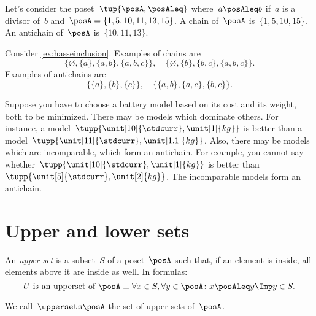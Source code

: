 \begin{example}
  Let's consider the poset~$\tup{\posA,\posAleq}$ where~$a\posAleq b$ if~$a$ is a divisor of~$b$ and~$\posA=\{1,5,10,11,13,15\}$. A chain of~$\posA$ is~$\{1,5,10,15\}$. An antichain of~$\posA$ is~$\{10,11,13\}$.
\end{example}

\begin{example}
  Consider \cref{ex:hasseinclusion}. Examples of chains are
  \begin{equation}
    \{\varnothing,\{a\},\{a,b\},\{a,b,c\}\}, \quad  \{\varnothing,\{b\},\{b,c\},\{a,b,c\}\}.
  \end{equation}
  Examples of antichains are
  \begin{equation}
    \{\{a\},\{b\},\{c\}\}, \quad \{ \{a,b\},\{a,c\}, \{b,c\}\}.
  \end{equation}
\end{example}

\begin{example}
  \label{ex:battery}
  Suppose you have to choose a battery model based on its cost and its weight, both to be minimized.
  There may be models which dominate others.
  For instance, a model~$\tupp{\unit[10]{\stdcurr},\unit[1]{kg}}$ is better than a model~$\tupp{\unit[11]{\stdcurr},\unit[1.1]{kg}}$.
  Also, there may be models which are incomparable, which form an antichain.
  For example, you cannot say whether~$\tupp{\unit[10]{\stdcurr},\unit[1]{kg}}$ is better than~$\tupp{\unit[5]{\stdcurr},\unit[2]{kg}}$. The incomparable models form an antichain.
\end{example}


\section{Upper and lower sets}

\begin{definition}
  \label{def:upperset}
  An \emph{upper set} is a subset~$S$ of a poset~$\posA$ such
  that, if an element is inside, all elements above it are inside as well.
  In formulas:
  \begin{equation}
    \text{$U$ is an upperset of $\posA$} \equiv \forall x\in S, \forall y\in \posA \colon x\posAleq y \Imp y\in S.
  \end{equation}
\end{definition}
We call~$\uppersets \posA$ the set of upper sets of~$\posA$.

